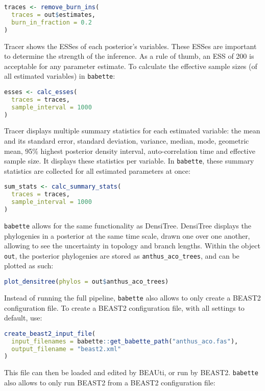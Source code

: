 \documentclass{article}
\begin{document}
\begin{lstlisting}[language=R, floatplacement=H]
traces <- remove_burn_ins(
  traces = out$estimates, 
  burn_in_fraction = 0.2
)
\end{lstlisting}
Tracer shows the ESSes of each posterior's variables.
These ESSes are important to determine the strength of the
inference. As a rule of thumb, an ESS of 200 is acceptable 
for any parameter estimate.
To calculate the effective sample sizes (of all estimated variables) in \verb;babette;:

\begin{lstlisting}[language=R, floatplacement=H]
esses <- calc_esses(
  traces = traces, 
  sample_interval = 1000
)
\end{lstlisting}
Tracer displays multiple summary statistics for each
estimated variable: the mean and its standard error, standard deviation,
variance, median, mode, geometric mean, 95\% highest posterior density interval, 
auto-correlation time and effective sample size. It displays these statistics per
variable. In \verb;babette;, these summary statistics are collected for
all estimated parameters at once: 

\begin{lstlisting}[language=R, floatplacement=H]
sum_stats <- calc_summary_stats(
  traces = traces, 
  sample_interval = 1000
)
\end{lstlisting}
\verb;babette; allows for the same functionality as DensiTree.
DensiTree displays the phylogenies in a posterior at the same
time scale, drawn one over one another, allowing to see the uncertainty in
topology and branch lengths. Within the object \verb;out;, 
the posterior phylogenies are stored as \verb;anthus_aco_trees;,
and can be plotted as such:

\begin{lstlisting}[language=R, floatplacement=H]
plot_densitree(phylos = out$anthus_aco_trees)
\end{lstlisting}
Instead of running the full pipeline, 
\verb;babette; also allows to only create a BEAST2 configuration file.
To create a BEAST2 configuration file, with all settings to default, use:

\begin{lstlisting}[language=R, floatplacement=H]
create_beast2_input_file(
  input_filenames = babette::get_babette_path("anthus_aco.fas"),
  output_filename = "beast2.xml"
)
\end{lstlisting}
This file can then be loaded and edited by BEAUti, or run by BEAST2.
\verb;babette; also allows to only run BEAST2 from a BEAST2 configuration
file: 
\end{document}
